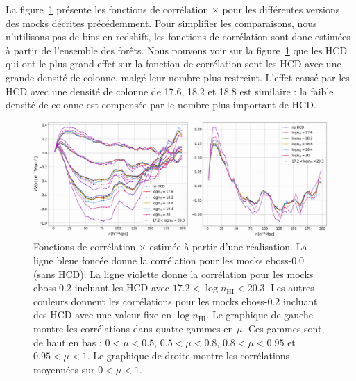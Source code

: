 \documentclass[11pt, twoside, a4paper, openright]{report}
\begin{document}
La figure~\ref{fig:cf_nhi_bins} présente les fonctions de corrélation \lya{}$\times$\lya{} pour les différentes versions des mocks décrites précédemment. Pour simplifier les comparaisons, nous n'utilisons pas de bins en redshift, les fonctions de corrélation sont donc estimées à partir de l'ensemble des forêts.
Nous pouvons voir sur la figure~\ref{fig:cf_nhi_bins} que les HCD qui ont le plus grand effet sur la fonction de corrélation sont les HCD avec une grande densité de colonne, malgé leur nombre plus restreint. L'effet causé par les HCD avec une densité de colonne de \num{17.6}, \num{18.2} et \num{18.8} est similaire : la faible densité de colonne est compensée par le nombre plus important de HCD.

\begin{figure}
  \centering
  \includegraphics[scale=0.35]{cf_nhi_bins}
  \caption{Fonctions de corrélation \lya{}$\times$\lya{} estimée à partir d'une réalisation.
    La ligne bleue foncée donne la corrélation pour les mocks eboss-0.0 (sans HCD). La ligne violette donne la corrélation pour les mocks eboss-0.2 incluant les HCD avec $\num{17.2} < \log n_{\mathrm{HI}} < \num{20.3}$. Les autres couleurs donnent les corrélations pour les mocks eboss-0.2 incluant des HCD avec une valeur fixe en $\log n_{\mathrm{HI}}$.
    Le graphique de gauche montre les corrélations dans quatre gammes en $\mu$. Ces gammes sont, de haut en bas : $\num{0}<\mu<\num{0.5}$, $\num{0.5}<\mu<\num{0.8}$, $\num{0.8}<\mu<\num{0.95}$ et $\num{0.95}<\mu<\num{1}$. Le graphique de droite montre les corrélations moyennées sur $\num{0} < \mu < \num{1}$.}
  \label{fig:cf_nhi_bins}
\end{figure}
\end{document}

